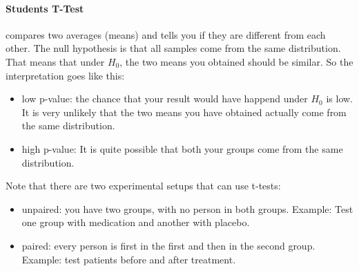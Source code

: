\paragraph{Students T-Test} compares two averages (means) and tells you if they are different from each other. The null hypothesis is that all samples come from the same distribution. That means that under $H_0$, the two means you obtained should be similar. So the interpretation goes like this: 
\begin{itemize}
    \item low p-value: the chance that your result would have happend under $H_0$ is low. It is very unlikely that the two means you have obtained actually come from the same distribution. 
    \item high p-value: It is quite possible that both your groups come from the same distribution. 
\end{itemize}
Note that there are two experimental setups that can use t-tests:
\begin{itemize}
    \item unpaired: you have two groups, with no person in both groups. Example: Test one group with medication and another with placebo. 
    \item paired: every person is first in the first and then in the second group. Example: test patients before and after treatment. 
\end{itemize}
